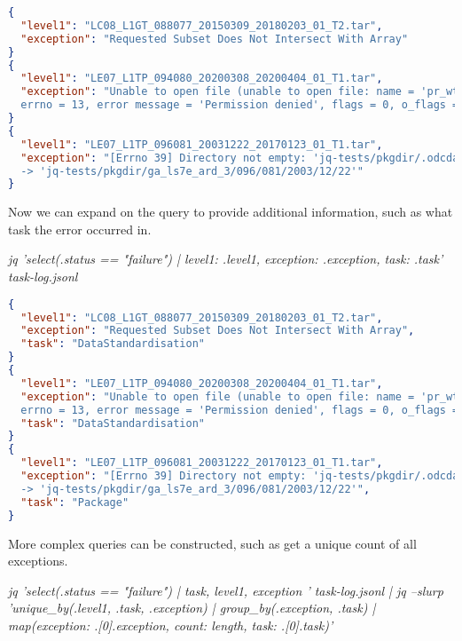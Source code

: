 \documentclass[a4paper,oneside,titlepage]{article}
\begin{document}
    \begin{lstlisting}[basicstyle=\tiny, language=json]
{
  "level1": "LC08_L1GT_088077_20150309_20180203_01_T2.tar",
  "exception": "Requested Subset Does Not Intersect With Array"
}
{
  "level1": "LE07_L1TP_094080_20200308_20200404_01_T1.tar",
  "exception": "Unable to open file (unable to open file: name = 'pr_wtr.eatm.2020.h5',
  errno = 13, error message = 'Permission denied', flags = 0, o_flags = 0)"
}
{
  "level1": "LE07_L1TP_096081_20031222_20170123_01_T1.tar",
  "exception": "[Errno 39] Directory not empty: 'jq-tests/pkgdir/.odcdataset-hai017xu'
  -> 'jq-tests/pkgdir/ga_ls7e_ard_3/096/081/2003/12/22'"
}
    \end{lstlisting}

    \begin{flushleft}
      Now we can expand on the query to provide additional information, such as what task the error occurred in. \par
      \textit{{\tiny jq 'select(.status == "failure") | {level1: .level1, exception: .exception, task: .task}' task-log.jsonl}}
    \end{flushleft}

    \begin{lstlisting}[basicstyle=\tiny, language=json]
{
  "level1": "LC08_L1GT_088077_20150309_20180203_01_T2.tar",
  "exception": "Requested Subset Does Not Intersect With Array",
  "task": "DataStandardisation"
}
{
  "level1": "LE07_L1TP_094080_20200308_20200404_01_T1.tar",
  "exception": "Unable to open file (unable to open file: name = 'pr_wtr.eatm.2020.h5',
  errno = 13, error message = 'Permission denied', flags = 0, o_flags = 0)",
  "task": "DataStandardisation"
}
{
  "level1": "LE07_L1TP_096081_20031222_20170123_01_T1.tar",
  "exception": "[Errno 39] Directory not empty: 'jq-tests/pkgdir/.odcdataset-hai017xu'
  -> 'jq-tests/pkgdir/ga_ls7e_ard_3/096/081/2003/12/22'",
  "task": "Package"
}
    \end{lstlisting}

    \begin{flushleft}
      More complex queries can be constructed, such as get a unique count of all exceptions. \par
      \textit{{\tiny jq 'select(.status == "failure") |
      {task, level1, exception} ' task-log.jsonl |
      jq --slurp 'unique\_by(.level1, .task, .exception) |
      group\_by(.exception, .task) |
      map({exception: .[0].exception, count: length, task: .[0].task})'}}
    \end{flushleft}
\end{document}
